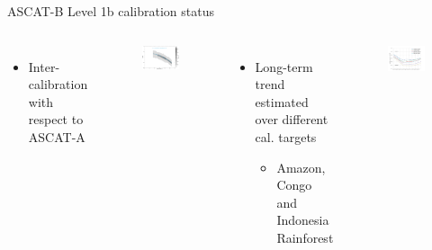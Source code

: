\documentclass[10pt,ignorenonframetext,xcolor={dvipsnames, table}]{beamer}
\providecommand{\tightlist}{%
\setlength{\itemsep}{0pt}\setlength{\parskip}{0pt}}
\begin{document}
\begin{frame}{ASCAT-B Level 1b calibration status}

\begin{columns}


\begin{itemize}
\tightlist
\item
  Inter-calibration with respect to ASCAT-A
\end{itemize}

\begin{figure}
\includegraphics[width=.8\textwidth]{./figures/CalibrationRefModel1_A.png}
\end{figure}


\begin{itemize}
\tightlist
\item
  Long-term trend estimated over different cal. targets

  \begin{itemize}
  \tightlist
  \item
    Amazon, Congo and Indonesia Rainforest
  \end{itemize}
\end{itemize}

\begin{figure}
\includegraphics[width=.8\textwidth]{./figures/metop_b_ascat_calibration.png}
\end{figure}

\end{columns}

\end{frame}
\end{document}
